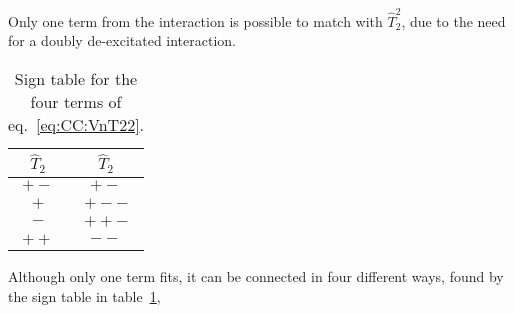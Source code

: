Only one term from the interaction is possible to match with $\hat{T}_2^2$, due to the need for a doubly de-excitated interaction.
\begin{table}
\caption{Sign table for the four terms of eq.~\eqref{eq:CC:VnT22}.}
\label{tab:CC:SignVnT22}
\begin{center}
\begin{tabular}{c|c}
$\hat{T}_2$ & $\hat{T}_2$ \\ 
\hline 
$+-$ & $+-$ \\ 
$+$ & $+--$ \\ 
$-$ & $++-$ \\
$++$ & $--$
\end{tabular} 
\end{center}
\end{table}
Although only one term fits, it can be connected in four different ways, found by the sign table in table~\ref{tab:CC:SignVnT22},
